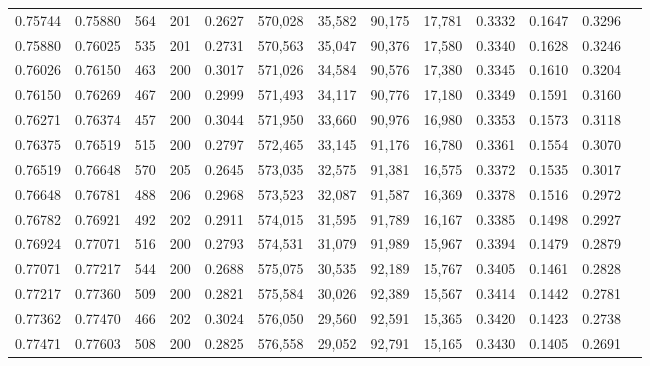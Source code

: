 \begin{tabular}{rrrrrrrrrrrrr}
0.75744 & 0.75880 &   564 & 201 &                                     0.2627 & 570,028 &  35,582 &  90,175 &  17,781 & 0.3332 & 0.1647 & 0.3296 \\
0.75880 & 0.76025 &   535 & 201 &                                     0.2731 & 570,563 &  35,047 &  90,376 &  17,580 & 0.3340 & 0.1628 & 0.3246 \\
0.76026 & 0.76150 &   463 & 200 &                                     0.3017 & 571,026 &  34,584 &  90,576 &  17,380 & 0.3345 & 0.1610 & 0.3204 \\
0.76150 & 0.76269 &   467 & 200 &                                     0.2999 & 571,493 &  34,117 &  90,776 &  17,180 & 0.3349 & 0.1591 & 0.3160 \\
0.76271 & 0.76374 &   457 & 200 &                                     0.3044 & 571,950 &  33,660 &  90,976 &  16,980 & 0.3353 & 0.1573 & 0.3118 \\
0.76375 & 0.76519 &   515 & 200 &                                     0.2797 & 572,465 &  33,145 &  91,176 &  16,780 & 0.3361 & 0.1554 & 0.3070 \\
0.76519 & 0.76648 &   570 & 205 &                                     0.2645 & 573,035 &  32,575 &  91,381 &  16,575 & 0.3372 & 0.1535 & 0.3017 \\
0.76648 & 0.76781 &   488 & 206 &                                     0.2968 & 573,523 &  32,087 &  91,587 &  16,369 & 0.3378 & 0.1516 & 0.2972 \\
0.76782 & 0.76921 &   492 & 202 &                                     0.2911 & 574,015 &  31,595 &  91,789 &  16,167 & 0.3385 & 0.1498 & 0.2927 \\
0.76924 & 0.77071 &   516 & 200 &                                     0.2793 & 574,531 &  31,079 &  91,989 &  15,967 & 0.3394 & 0.1479 & 0.2879 \\
0.77071 & 0.77217 &   544 & 200 &                                     0.2688 & 575,075 &  30,535 &  92,189 &  15,767 & 0.3405 & 0.1461 & 0.2828 \\
0.77217 & 0.77360 &   509 & 200 &                                     0.2821 & 575,584 &  30,026 &  92,389 &  15,567 & 0.3414 & 0.1442 & 0.2781 \\
0.77362 & 0.77470 &   466 & 202 &                                     0.3024 & 576,050 &  29,560 &  92,591 &  15,365 & 0.3420 & 0.1423 & 0.2738 \\
0.77471 & 0.77603 &   508 & 200 &                                     0.2825 & 576,558 &  29,052 &  92,791 &  15,165 & 0.3430 & 0.1405 & 0.2691 \\

\end{tabular}
